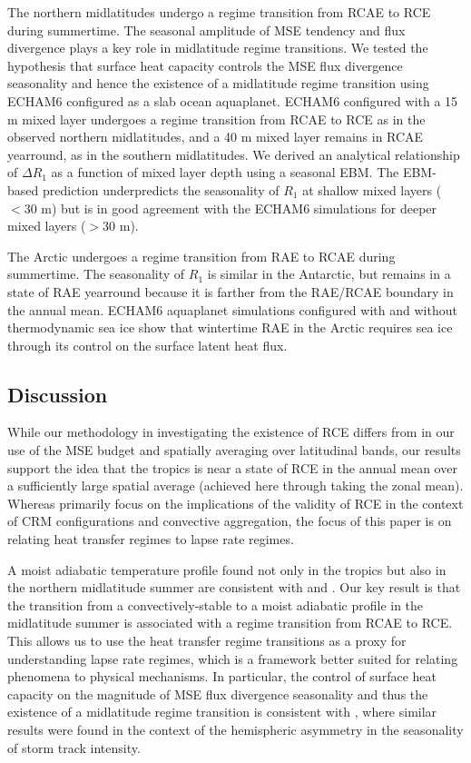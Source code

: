 \documentclass{ametsocV5}
\begin{document}
The northern midlatitudes undergo a regime transition from RCAE to RCE during summertime. The seasonal amplitude of MSE tendency and flux divergence plays a key role in midlatitude regime transitions. We tested the hypothesis that surface heat capacity controls the MSE flux divergence seasonality and hence the existence of a midlatitude regime transition using ECHAM6 configured as a slab ocean aquaplanet. ECHAM6 configured with a 15 m mixed layer undergoes a regime transition from RCAE to RCE as in the observed northern midlatitudes, and a 40 m mixed layer remains in RCAE yearround, as in the southern midlatitudes. We derived an analytical relationship of $\Delta R_1$ as a function of mixed layer depth using a seasonal EBM. The EBM-based prediction underpredicts the seasonality of $R_1$ at shallow mixed layers ($<30$ m) but is in good agreement with the ECHAM6 simulations for deeper mixed layers ($>30$ m).

The Arctic undergoes a regime transition from RAE to RCAE during summertime. The seasonality of $R_1$ is similar in the Antarctic, but remains in a state of RAE yearround because it is farther from the RAE/RCAE boundary in the annual mean. ECHAM6 aquaplanet simulations configured with and without thermodynamic sea ice show that wintertime RAE in the Arctic requires sea ice through its control on the surface latent heat flux.  

\subsection{Discussion}

While our methodology in investigating the existence of RCE differs from \cite{jakob2019} in our use of the MSE budget and spatially averaging over latitudinal bands, our results support the idea that the tropics is near a state of RCE in the annual mean over a sufficiently large spatial average (achieved here through taking the zonal mean). Whereas \cite{jakob2019} primarily focus on the implications of the validity of RCE in the context of CRM configurations and convective aggregation, the focus of this paper is on relating heat transfer regimes to lapse rate regimes.

A moist adiabatic temperature profile found not only in the tropics but also in the northern midlatitude summer are consistent with \cite{stone1979} and \cite{korty2007}. Our key result is that the transition from a convectively-stable to a moist adiabatic profile in the midlatitude summer is associated with a regime transition from RCAE to RCE. This allows us to use the heat transfer regime transitions as a proxy for understanding lapse rate regimes, which is a framework better suited for relating phenomena to physical mechanisms. In particular, the control of surface heat capacity on the magnitude of MSE flux divergence seasonality and thus the existence of a midlatitude regime transition is consistent with \cite{barpanda2020}, where similar results were found in the context of the hemispheric asymmetry in the seasonality of storm track intensity. 
\end{document}
